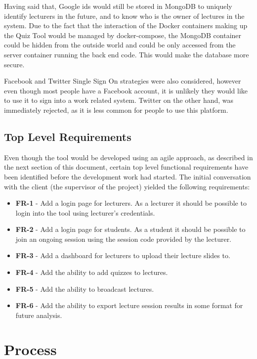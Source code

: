 Having said that, Google ids would still be stored in MongoDB to uniquely identify
lecturers in the future, and to know who is the owner of lectures in the system.
Due to the fact that the interaction of the Docker containers making up the Quiz Tool would
be managed by docker-compose, the MongoDB container could be hidden from the outside world
and could be only accessed from the server container running the back end code. This would
make the database more secure.

Facebook and Twitter Single Sign On strategies\cite{facebook}\cite{twitter} were also
considered, however even though most people have a Facebook account, it is unlikely they
would like to use it to sign into a work related system. Twitter on the other hand,
was immediately rejected, as it is less common for people to use this platform. 

\subsection{Top Level Requirements}
\label{subsection:toplevel}
Even though the tool would be developed using an agile approach, as described in the next
section of this document, certain top level functional requirements have been identified
before the development work had started. The initial conversation with the client (the
supervisor of the project) yielded the following requirements:

\begin{itemize}
  \item \textbf{FR-1} - Add a login page for lecturers. As a lecturer it should be possible to login
  into the tool using lecturer's credentials.
  \item \textbf{FR-2} - Add a login page for students. As a student it should be possible to join
  an ongoing session using the session code provided by the lecturer.
  \item \textbf{FR-3} - Add a dashboard for lecturers to upload their lecture slides to.
  \item \textbf{FR-4} - Add the ability to add quizzes to lectures.
  \item \textbf{FR-5} - Add the ability to broadcast lectures.
  \item \textbf{FR-6} - Add the ability to export lecture session results in some format
  for future analysis.
\end{itemize}

\section{Process}
